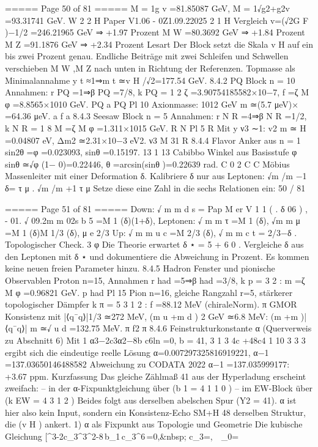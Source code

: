 \begin{MyVerbatim}
{===== Page 50 of 81 =====
M = 1g v =81.85087 GeV, M = 1√g2+g2v =93.31741 GeV.
W 2 2 H Paper V1.06 - 0Z1.09.22025 2 1 H
Vergleich
v=(√2G F )−1/2 =246.21965 GeV ⇒ +1.97 Prozent
M W =80.3692 GeV ⇒ +1.84 Prozent
M Z =91.1876 GeV ⇒ +2.34 Prozent
Lesart
Der Block setzt die Skala v H auf ein bis zwei Prozent genau. Endliche Beiträge mit zwei Schleifen und Schwellen
verschieben M W ,M Z nach unten in Richtung der Referenzen.
Topmasse als Minimalannahme
y
t
≈1⇒m
t
≃v
H
/√2=177.54 GeV.
8.4.2 PQ Block n = 10
Annahmen: r PQ =1⇒β PQ =7/8, k PQ = 1 2
ζ =3.90754185582×10−7, f =ζ M φ =8.8565×1010 GeV.
PQ a PQ Pl 10
Axionmasse:
1012 GeV
m ≃(5.7 μeV)× =64.36 μeV.
a f
a
8.4.3 Seesaw Block n = 5
Annahmen: r N R =4⇒β N R =1/2, k N R = 1 8
M =ζ M φ =1.311×1015 GeV.
R N Pl 5
R
Mit y ν3 ∼1:
v2
m ≃ H =0.04807 eV, Δm2 ≃2.31×10−3 eV2.
ν3 M 31
R
8.4.4 Flavor Anker aus n = 1
sin2θ =φ =0.023093, sinθ =0.15197.
13 1 13
Cabibbo Winkel aus Basisstufe
φ
sinθ ≃√φ (1− 0)=0.22446, θ =arcsin(sinθ )=0.22639 rad.
C 0 2 C C
Möbius Massenleiter mit einer Deformation δ.
Kalibriere δ nur aus Leptonen:
√m /m −1
δ= τ μ .
√m /m +1
τ μ
Setze diese eine Zahl in die sechs Relationen ein:
50 / 81

===== Page 51 of 81 =====
Down: √ m m d s = Pap M er V 1 1 ( . δ 06 ) , - 01. √ 09.2m m 02s b 5 =M 1 (δ)(1+δ),
Leptonen: √ m m τ =M 1 (δ), √m m μ =M 1 (δ)M 1/3 (δ),
μ e
2/3
Up: √ m m u c =M 2/3 (δ), √ m m c t = 2/3−δ .
Topologischer Check.
3 φ
Die Theorie erwartet δ ⋆ = 5 + 6 0 .
Vergleiche δ aus den Leptonen mit δ ⋆ und dokumentiere die Abweichung in Prozent.
Es kommen keine neuen freien Parameter hinzu.
8.4.5 Hadron Fenster und pionische Observablen
Proton n=15, Annahmen r had =5⇒β had =3/8, k p = 3 2 :
m =ζ M φ =0.96821 GeV.
p had Pl 15
Pion n=16, gleiche Rangzahl r=5, stärkerer topologischer Dämpfer k π = 5 3 1 2 :
f =88.12 MeV (chiraleNorm).
π
GMOR Konsistenz mit |⟨q¯q⟩|1/3 ≃272 MeV, (m u +m d ) 2 GeV ≃6.8 MeV:
(m +m )|⟨q¯q⟩|
m ≃√ u d =132.75 MeV.
π f2
π
8.4.6 Feinstrukturkonstante α
(Querverweis zu Abschnitt 6)
Mit
1
α3−2c3α2−8b c6ln =0, b = 41,
3 1 3 4c +48c4 1 10
3 3 3
ergibt sich die eindeutige reelle Lösung
α=0.007297325816919221, α−1 =137.03650146488582
Abweichung zu CODATA 2022 α−1 =137.035999177: +3.67 ppm.
Kurzfassung
Das gleiche Zählmaß 41 aus der Hyperladung erscheint zweifach:
– in der α-Fixpunktgleichung über (b 1 = 4 1 1 0 )
– im EW-Block über (k EW = 4 3 1 2 )
Beides folgt aus derselben abelschen Spur (Y2 = 41). α ist hier also kein Input, sondern ein Konsistenz-Echo
SM+H 48
derselben Struktur, die (v H ) ankert.
1) α als Fixpunkt aus Topologie und Geometrie
Die kubische Gleichung
[\alpha^{3}-2c_3^{3}\alpha^{2}-8\,b_1\,c_3^{6}\,\ln\!=0,\quad&nbsp; c_3=,\ \ \varphi_0=}
\end{MyVerbatim}
